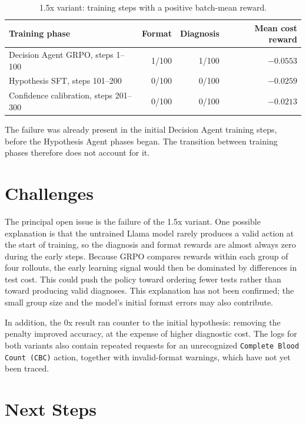 \documentclass[11pt]{article}
\begin{document}
\begin{table}[ht]
  \centering
  \caption{1.5x variant: training steps with a positive batch-mean reward.}
  \label{tab:collapse}
  \begin{tabular}{lrrr}
    \toprule
    Training phase & Format & Diagnosis & Mean cost reward \\
    \midrule
    Decision Agent GRPO, steps 1--100 & 1/100 & 1/100 & $-0.0553$ \\
    Hypothesis SFT, steps 101--200 & 0/100 & 0/100 & $-0.0259$ \\
    Confidence calibration, steps 201--300 & 0/100 & 0/100 & $-0.0213$ \\
    \bottomrule
  \end{tabular}
\end{table}

The failure was already present in the initial Decision Agent training steps,
before the Hypothesis Agent phases began. The transition between training
phases therefore does not account for it.

\section{Challenges}

The principal open issue is the failure of the 1.5x variant. One possible
explanation is that the untrained Llama model rarely produces a valid action
at the start of training, so the diagnosis and format rewards are almost
always zero during the early steps. Because GRPO compares rewards within each
group of four rollouts, the early learning signal would then be dominated by
differences in test cost. This could push the policy toward ordering fewer
tests rather than toward producing valid diagnoses. This explanation has not
been confirmed; the small group size and the model's initial format errors may
also contribute.

In addition, the 0x result ran counter to the initial hypothesis: removing the
penalty improved accuracy, at the expense of higher diagnostic cost. The logs
for both variants also contain repeated requests for an unrecognized
\texttt{Complete Blood Count (CBC)} action, together with invalid-format
warnings, which have not yet been traced.

\section{Next Steps}
\end{document}
